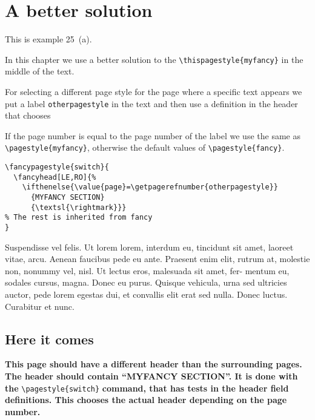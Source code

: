 \documentclass[openany]{book}
\begin{document}
\chapter{A better solution}
\label{ch:pageref}
\pagestyle{switch}

\begin{boxedminipage}{\textwidth}
This is example 25~(a).

In this chapter we use a better solution to the \verb|\thispagestyle{myfancy}| in the middle of the text.

For selecting a different page style for the page where a specific text appears we put a label \texttt{otherpagestyle} in the text and then use a definition in the header that chooses

 If the page number is equal to the page number of the label we use the same as \verb|\pagestyle{myfancy}|, otherwise the default values of \verb|\pagestyle{fancy}|.

\begin{verbatim}
\fancypagestyle{switch}{
  \fancyhead[LE,RO]{%
    \ifthenelse{\value{page}=\getpagerefnumber{otherpagestyle}}
      {MYFANCY SECTION}
      {\textsl{\rightmark}}}
% The rest is inherited from fancy
}
\end{verbatim}
\end{boxedminipage}

\bigskip

\lipsum[6-8]

\bigskip
Suspendisse vel felis. Ut lorem lorem, interdum eu, tincidunt sit amet, laoreet vitae, arcu. Aenean faucibus pede eu ante. Praesent enim elit, rutrum at, molestie non, nonummy vel, nisl. Ut lectus eros, malesuada sit amet, fer- mentum eu, sodales cursus, magna. Donec eu purus. Quisque vehicula, urna sed ultricies auctor, pede lorem egestas dui, et convallis elit erat sed nulla. Donec luctus. Curabitur et nunc. 

\section{Here it comes}

\noindent
\begin{boxedminipage}{\textwidth}
\begin{minipage}{\linewidth}
  \textbf{This page should have a different header than the surrounding
    pages. The header should contain \textnormal{``MYFANCY SECTION''}.
    \label{otherpagestyle}
    It is done with the} \verb|\pagestyle{switch}| \textbf{command, that
    has tests in the header field definitions. This chooses the actual
    header depending on the page number.}
\end{minipage}
\end{boxedminipage}
\bigskip
\end{document}
